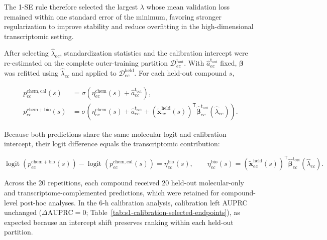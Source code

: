 \documentclass[11pt,a4paper]{article}
\begin{document}
The 1-SE rule therefore selected the largest $\lambda$ whose mean
validation loss remained within one standard error of the minimum,
favoring stronger regularization to improve stability and reduce overfitting in the
high-dimensional transcriptomic setting.

After selecting $\widehat\lambda_{ec}$, standardization statistics and the
calibration intercept were re-estimated on the complete outer-training
partition $\mathcal D_{ec}^{\mathrm{t_{out}}}$.
With $\widehat a_{ec}^{\mathrm{t_{out}}}$ fixed,
$\boldsymbol\beta$ was refitted using $\widehat\lambda_{ec}$ and applied
to $\mathcal D_{ec}^{\mathrm{held}}$. For each held-out compound $s$,

\begin{equation}
\begin{aligned}
p^{\mathrm{chem,cal}}_{ec}(s)
&=
\sigma\!\left(
\eta^{\mathrm{chem}}_{ec}(s)
+
\widehat a_{ec}^{\mathrm{t_{out}}}
\right),
\\
p^{\mathrm{chem+bio}}_{ec}(s)
&=
\sigma\!\left(
\eta^{\mathrm{chem}}_{ec}(s)
+
\widehat a_{ec}^{\mathrm{t_{out}}}
+
(\widetilde{\mathbf x}_{ec}^{\mathrm{held}}(s))^{\mathsf T}
\widehat{\boldsymbol\beta}_{ec}^{\mathrm{t_{out}}}
(\widehat\lambda_{ec})
\right).
\end{aligned}
\label{eq:final-predictions}
\end{equation}

Because both predictions share the same molecular logit and calibration
intercept, their logit difference equals the transcriptomic contribution:

\begin{equation}
\operatorname{logit}
\!\left(p^{\mathrm{chem+bio}}_{ec}(s)\right)
-
\operatorname{logit}
\!\left(p^{\mathrm{chem,cal}}_{ec}(s)\right)
=
\eta^{\mathrm{bio}}_{ec}(s),
\qquad
\eta^{\mathrm{bio}}_{ec}(s)
=
(\widetilde{\mathbf x}_{ec}^{\mathrm{held}}(s))^{\mathsf T}
\widehat{\boldsymbol\beta}_{ec}^{\mathrm{t_{out}}}
(\widehat\lambda_{ec}).
\label{eq:logit-contribution}
\end{equation}

Across the 20 repetitions, each compound received 20 held-out molecular-only
and transcriptome-complemented predictions, which were retained for
compound-level post-hoc analyses. In the 6-h calibration analysis, calibration
left AUPRC unchanged ($\Delta\mathrm{AUPRC}=0$;
Table~\ref{tab:s1-calibration-selected-endpoints}), as expected because an
intercept shift preserves ranking within each held-out partition.
\end{document}
